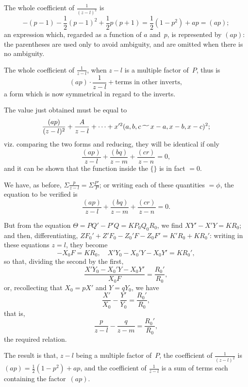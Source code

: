 \documentclass[11pt,a4paper]{book}
\begin{document}
\begin{art}
The whole coefficient of $\frac{1}{(z-l)^2}$ is
\[
-(p-1) - \frac{1}{2}(p-1)^2 + \frac{1}{2}p(p+1) = \frac{1}{2}(1-p^2) + ap = (ap);
\]
an expression which, regarded as a function of $a$ and~$p$, is represented
by $(ap)$: the parentheses are used only to avoid ambiguity, and are
omitted when there is no ambiguity.
\end{art}

\begin{art}
The whole coefficient of $\frac{1}{z-l}$, when $z-l$ is a multiple factor
of~$P$, thus is
\[
(ap) \cdot \frac{1}{z-l} + \text{terms in other inverts},
\]
a form which is now symmetrical in regard to the inverts.
\end{art}

\begin{art}
The value just obtained must be equal to
\[
\frac{(ap)}{(z-l)^2} + \frac{A}{z-l} + \cdots + x'^2 (a, b, c \,\raisebox{-.5ex}{$\widetilde{\phantom{aa}}$}\, x-a, x-b, x-c)^2;
\]
viz. comparing the two forms and reducing, they will be identical if only
\[
\frac{(ap)}{z-l} + \frac{(bq)}{z-m} + \frac{(cr)}{z-n} = 0,
\]
and it can be shown that the function inside the $\{\}$ is in fact $=0$.
\end{art}

\begin{art}
We have, as before, $\Sigma \frac{p}{z-l} = \Sigma \frac{P'}{P}$; or writing each of
these quantities $= \phi$, the equation to be verified is
\[
\frac{(ap)}{z-l} + \frac{(bq)}{z-m} + \frac{(cr)}{z-n} = 0.
\]
\end{art}

\begin{art}
But from the equation $\Theta = PQ' - P'Q = KP_0 Q_0 R_0$, we find
$XY' - X'Y = KR_0$; and then, differentiating,
$ZF_0' + Z'F_0 - Z_0'F - Z_0F' = K'R_0 + KR_0'$: writing in these equations
$z = l$, they become
\[
-X_0 F = KR_0, \quad X'Y_0 - X_0'Y - X_0 Y' = KR_0',
\]
so that, dividing the second by the first,
\[
\frac{X'Y_0 - X_0'Y - X_0 Y'}{X_0 F} = \frac{R_0'}{R_0},
\]
or, recollecting that $X_0 = pX'$ and $Y = qY_0$, we have
\[
\frac{X'}{X_0} - \frac{Y'}{Y_0} = \frac{R_0'}{R_0},
\]
that is,
\[
\frac{p}{z-l} - \frac{q}{z-m} = \frac{R_0'}{R_0},
\]
the required relation.
\end{art}

\begin{art}
The result is that, $z-l$ being a multiple factor of~$P$, the coefficient
of $\frac{1}{(z-l)^2}$ is $(ap) = \frac{1}{2}(1-p^2) + ap$, and the coefficient
of $\frac{1}{z-l}$ is a sum of terms each containing the factor~$(ap)$.
\end{art}
\end{document}
